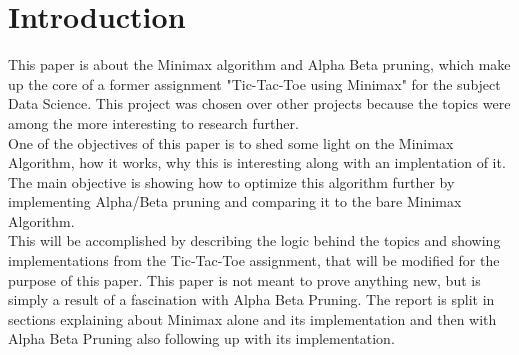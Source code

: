 \section{Introduction}
\label{sec:introduction} %
This paper is about the Minimax algorithm and Alpha Beta pruning, which make up the core of a former assignment 
"Tic-Tac-Toe using Minimax" for the subject Data Science. This project was chosen over other projects because 
the topics were among the more interesting to research further.
\\
One of the objectives of this paper is to shed some light on the Minimax Algorithm, 
how it works, why this is interesting along with an implentation of it.
The main objective is showing how to optimize this algorithm further by implementing Alpha/Beta pruning and comparing 
it to the bare Minimax Algorithm.
\\
This will be accomplished by describing the logic behind the topics and showing implementations from the Tic-Tac-Toe assignment,
that will be modified for the purpose of this paper.
This paper is not meant to prove anything new, but is simply a result of a fascination with Alpha Beta Pruning.
The report is split in sections explaining about Minimax alone and its implementation and then with Alpha Beta Pruning 
also following up with its implementation.
\clearpage
